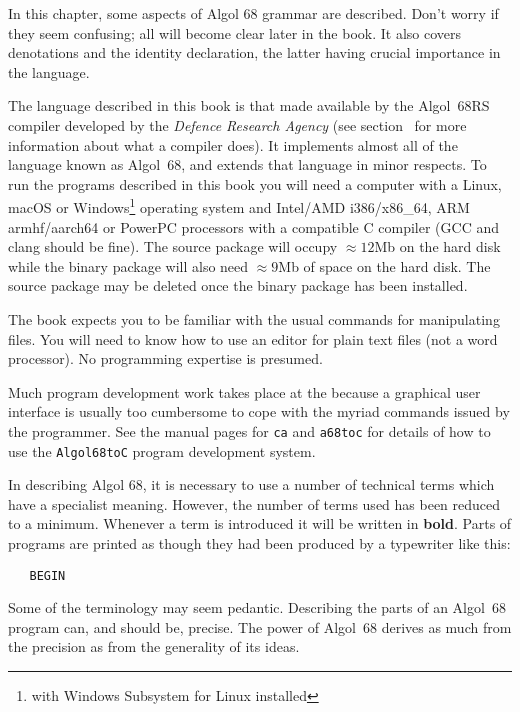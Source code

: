 In this chapter, some aspects of Algol 68 grammar are described.
Don't worry if they seem confusing; all will become clear later in
the book.  It also covers denotations and the identity declaration,
the latter having crucial importance in the language.

The language described in this book is that made available by the
 Algol~68RS compiler developed by the
\emph{Defence Research Agency} (see section~ for more
information about what a compiler does).
It implements almost all of the language known as Algol~68,
and extends that language in minor respects.
To run the programs described in this book you will need a computer with a Linux,
macOS or Windows\footnote{with Windows Subsystem for Linux installed}
operating system and Intel/AMD i386/x86\_64, ARM armhf/aarch64 or PowerPC
processors with a compatible C compiler (GCC and clang should be fine).
The source package will occupy
$\approx12$Mb on the hard disk while the binary package will also need
$\approx9$Mb of space on the hard disk. The source package may be
deleted once the binary package has been installed.

The book expects you to be familiar with the usual commands for
manipulating files. You will need to know how to use an editor for
plain text files (not a word processor).  No programming expertise is
presumed.

Much program development work takes place at the  because a graphical user interface is usually too cumbersome to
cope with the myriad commands issued by the programmer.  See the
manual pages for \verb|ca| and \verb|a68toc| for details of how to
use the \verb|Algol68toC| program development system.

In describing Algol 68, it is necessary to use a number of technical
terms which have a specialist meaning. However, the number of terms
used has been reduced to a minimum. Whenever a term is introduced it
will be written in \textbf{bold}. Parts of programs are printed as though
they had been produced by a typewriter like this:
\begin{verbatim}
   BEGIN
\end{verbatim}
\noindent
Some of the terminology may seem pedantic. Describing the parts of an
Algol~68 program can, and should be, precise. The power of Algol~68
derives as much from the precision as from the generality of its ideas.


